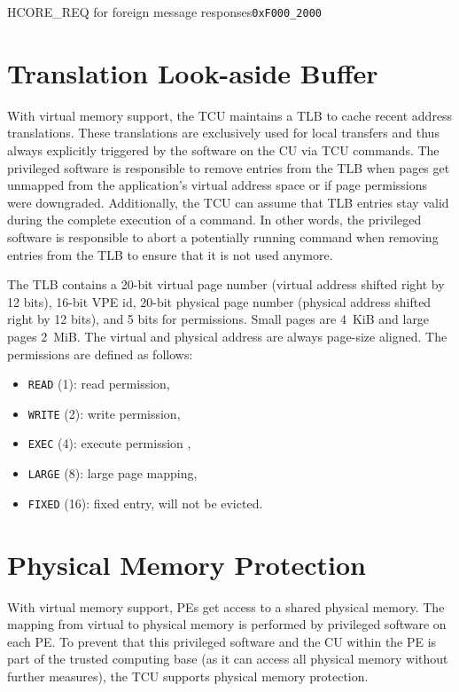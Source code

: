 \begin{register}{H}{CORE\_REQ for foreign message responses}{\texttt{0xF000\_2000}}
  \regnewline%
\end{register}
\extend{}

\section{Translation Look-aside Buffer}
\label{sec:tlb}

With virtual memory support, the TCU maintains a TLB to cache recent address translations. These
translations are exclusively used for local transfers and thus always explicitly triggered by the
software on the CU via TCU commands. The privileged software is responsible to remove entries from
the TLB when pages get unmapped from the application's virtual address space or if page permissions
were downgraded. Additionally, the TCU can assume that TLB entries stay valid during the complete
execution of a command. In other words, the privileged software is responsible to abort a
potentially running command when removing entries from the TLB to ensure that it is not used
anymore.

The TLB contains a 20-bit virtual page number (virtual address shifted right by 12 bits),
\colorbox{pemux}{16-bit VPE id, }20-bit physical page number (physical address shifted right by 12
bits), and 5 bits for permissions. Small pages are 4~KiB and large pages 2~MiB. The virtual and
physical address are always page-size aligned. The permissions are defined as follows:

\begin{itemize}
  \item \texttt{READ} (1): read permission,
  \item \texttt{WRITE} (2): write permission,
  \item \texttt{EXEC} (4): execute permission ,
  \item \texttt{LARGE} (8): large page mapping,
  \item \texttt{FIXED} (16): fixed entry, will not be evicted.
\end{itemize}

\section{Physical Memory Protection}

\noindent With virtual memory support, PEs get access to a shared physical memory. The mapping from
virtual to physical memory is performed by privileged software on each PE. To prevent that this
privileged software and the CU within the PE is part of the trusted computing base (as it can access
all physical memory without further measures), the TCU supports physical memory protection.

